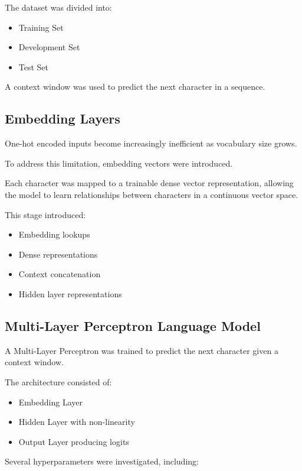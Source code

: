\documentclass[11pt,a4paper]{article}
\begin{document}
The dataset was divided into:

\begin{itemize}
    \item Training Set
    \item Development Set
    \item Test Set
\end{itemize}

A context window was used to predict the next character in a sequence.

\subsection{Embedding Layers}

One-hot encoded inputs become increasingly inefficient as vocabulary size grows.

To address this limitation, embedding vectors were introduced.

Each character was mapped to a trainable dense vector representation, allowing the model to learn relationships between characters in a continuous vector space.

This stage introduced:

\begin{itemize}
    \item Embedding lookups
    \item Dense representations
    \item Context concatenation
    \item Hidden layer representations
\end{itemize}

\subsection{Multi-Layer Perceptron Language Model}

A Multi-Layer Perceptron was trained to predict the next character given a context window.

The architecture consisted of:

\begin{itemize}
    \item Embedding Layer
    \item Hidden Layer with non-linearity
    \item Output Layer producing logits
\end{itemize}

Several hyperparameters were investigated, including:
\end{document}
